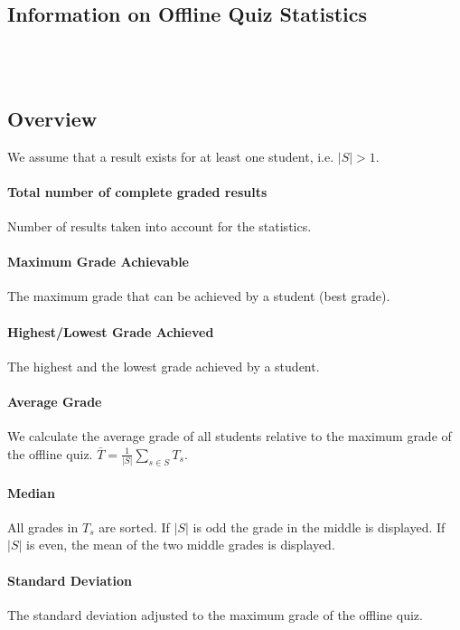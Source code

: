 \documentclass[12pt]{report}
\begin{document}
\subsection{Information on Offline Quiz Statistics}

\ \\
\ \\

\subsection{Overview}
\label{subsubsec:overview}

We assume that a result exists for at least one student, i.e. $|S|>1$.

\paragraph{Total number of complete graded results}
Number of results taken into account for the statistics.

\paragraph{Maximum Grade Achievable}
The maximum grade that can be achieved by a student (best grade).

\paragraph{Highest/Lowest Grade Achieved}
The highest and the lowest grade achieved by a student.

\paragraph{Average Grade}
We calculate the average grade of all students relative to the maximum grade of the offline quiz.
$\bar{T}=\frac{1}{|S|}\sum\limits_{s\in S}T_s$.

\paragraph{Median}
All grades in $T_s$ are sorted. If $|S|$ is odd the grade in the middle is displayed. If $|S|$ is even, the mean of the two middle grades is displayed.


\paragraph{Standard Deviation}
The standard deviation adjusted to the maximum grade of the offline quiz.
\end{document}
